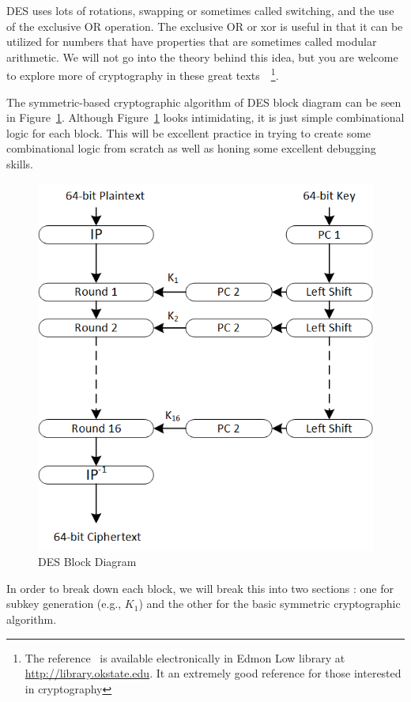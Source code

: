 \documentclass{article}
\begin{document}
DES uses lots of rotations, swapping or sometimes called
switching, and the use of the exclusive OR operation.
The exclusive OR
or xor 
is useful in that it can be utilized for numbers that have
properties that are sometimes called modular arithmetic.  We will not
go into the theory behind this idea, but you are welcome to explore
more of cryptography in
these great texts~\cite{10.5555/1721909,
  10.5555/2523199}~\footnote{The reference~\cite{10.5555/1721909} is available
electronically in Edmon Low library at
\url{http://library.okstate.edu}.  It an extremely good reference for
those interested in cryptography}.

The symmetric-based cryptographic
algorithm of DES block diagram
can be seen in
Figure~\ref{des-main.png}.  Although Figure~\ref{des-main.png}
looks intimidating, it is just simple combinational logic for each
block.  This will be excellent practice in trying to create some
combinational logic from scratch as well as honing some excellent
debugging skills.  
\begin{figure}
  \centering
  \includegraphics[scale=1.1]{des-main.png}
  \caption{DES Block Diagram}
  \label{des-main.png}
\end{figure}
In order to break down each block, we will break this into two
sections : one for subkey generation (e.g., $K_1$) and the
other for the basic symmetric cryptographic algorithm.
\end{document}
